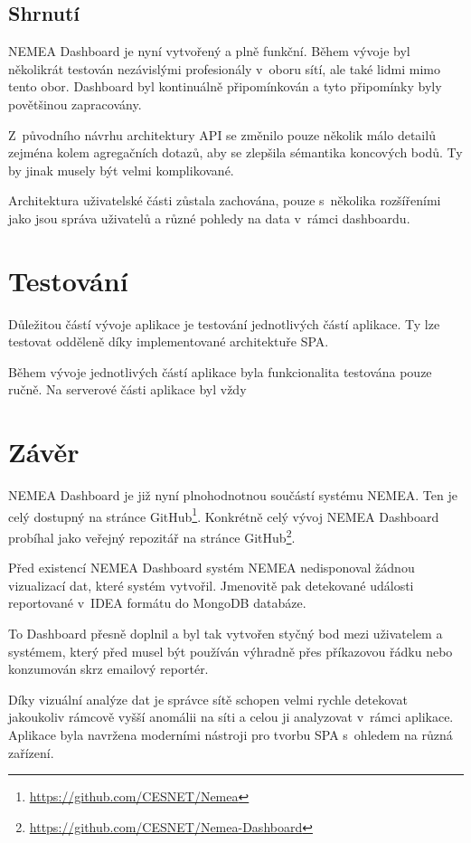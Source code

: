 \section{Shrnutí}

NEMEA Dashboard je nyní vytvořený a plně funkční. Během vývoje byl několikrát testován nezávislými profesionály v~oboru sítí, ale také lidmi mimo tento obor. Dashboard byl kontinuálně připomínkován a tyto připomínky byly povětšinou zapracovány.

Z~původního návrhu architektury API se změnilo pouze několik málo detailů zejména kolem agregačních dotazů, aby se zlepšila sémantika koncových bodů. Ty by jinak musely být velmi komplikované.

Architektura uživatelské části zůstala zachována, pouze s~několika rozšířeními jako jsou správa uživatelů a různé pohledy na data v~rámci dashboardu.

\chapter{Testování}

Důležitou částí vývoje aplikace je testování jednotlivých částí aplikace. Ty lze testovat odděleně díky implementované architektuře SPA.

Během vývoje jednotlivých částí aplikace byla funkcionalita testována pouze ručně. Na serverové části aplikace byl vždy 

\chapter{Závěr}

NEMEA Dashboard je již nyní plnohodnotnou součástí systému NEMEA. Ten je celý dostupný na stránce GitHub\footnote{\url{https://github.com/CESNET/Nemea}}. Konkrétně celý vývoj NEMEA Dashboard probíhal jako veřejný repozitář na stránce GitHub\footnote{\url{https://github.com/CESNET/Nemea-Dashboard}}.

Před existencí NEMEA Dashboard systém NEMEA nedisponoval žádnou vizualizací dat, které systém vytvořil. Jmenovitě pak detekované události reportované v~IDEA formátu do MongoDB databáze.

To Dashboard přesně doplnil a byl tak vytvořen styčný bod mezi uživatelem a systémem, který před musel být používán výhradně přes příkazovou řádku nebo konzumován skrz emailový reportér.

Díky vizuální analýze dat je správce sítě schopen velmi rychle detekovat jakoukoliv rámcově vyšší anomálii na síti a celou ji analyzovat v~rámci aplikace. Aplikace byla navržena moderními nástroji pro tvorbu SPA s~ohledem na různá zařízení.

